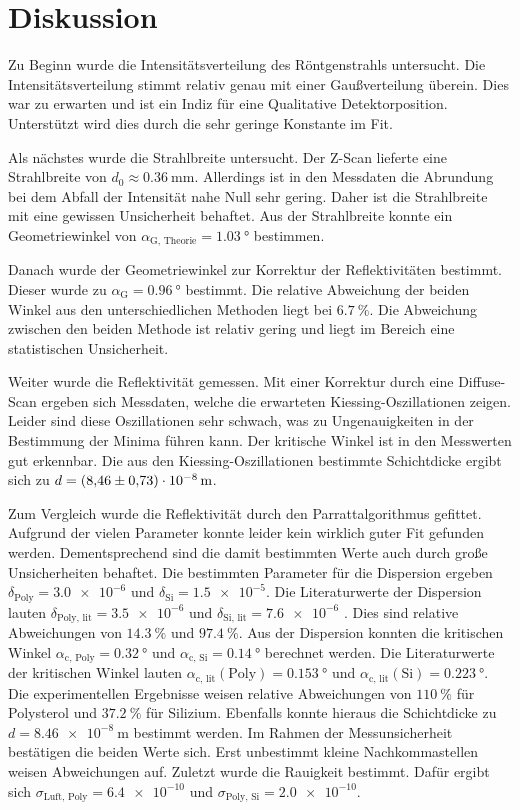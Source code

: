 \chapter{Diskussion}
\label{cha:Diskussion}
Zu Beginn wurde die Intensitätsverteilung des Röntgenstrahls untersucht. Die Intensitätsverteilung stimmt relativ genau mit einer Gaußverteilung überein. Dies war zu erwarten und 
ist ein Indiz für eine Qualitative Detektorposition. Unterstützt wird dies durch die sehr geringe Konstante im Fit. 

Als nächstes wurde die Strahlbreite untersucht. Der Z-Scan lieferte eine Strahlbreite von $d_0 \approx \qty{0.36}{\milli\metre}$. Allerdings ist in den Messdaten die Abrundung bei 
dem Abfall der Intensität nahe Null sehr gering. Daher ist die Strahlbreite mit eine gewissen Unsicherheit behaftet. Aus der Strahlbreite konnte ein Geometriewinkel von 
$\alpha_\text{G, Theorie} = \qty{1.03}{\degree}$ bestimmen.

Danach wurde der Geometriewinkel zur Korrektur der Reflektivitäten bestimmt. Dieser wurde zu $\alpha_\text{G} = \qty{0.96}{\degree}$ bestimmt. Die relative Abweichung der beiden Winkel 
aus den unterschiedlichen Methoden liegt bei $\qty{6.7}{\percent}$. Die Abweichung zwischen den beiden Methode ist relativ gering und liegt im Bereich eine statistischen Unsicherheit.

Weiter wurde die Reflektivität gemessen. Mit einer Korrektur durch eine Diffuse-Scan ergeben sich Messdaten, welche die erwarteten Kiessing-Oszillationen zeigen. Leider sind diese 
Oszillationen sehr schwach, was zu Ungenauigkeiten in der Bestimmung der Minima führen kann. Der kritische Winkel ist in den Messwerten gut erkennbar. Die aus den 
Kiessing-Oszillationen bestimmte Schichtdicke ergibt sich zu $d = \qty{8.46 +- 0.73e-8}{\metre}$.

Zum Vergleich wurde die Reflektivität durch den Parrattalgorithmus gefittet. Aufgrund der vielen Parameter konnte leider kein wirklich guter Fit gefunden werden. Dementsprechend 
sind die damit bestimmten Werte auch durch große Unsicherheiten behaftet. Die bestimmten Parameter für die Dispersion ergeben $\delta_\text{Poly} = \num{3.0e-6}$ und 
$\delta_\text{Si} = \num{1.5e-5}$. Die Literaturwerte der Dispersion lauten $\delta_\text{Poly, lit} = \num{3.5e-6}$ und $\delta_\text{Si, lit} = \num{7.6e-6}$ \cite{V44}.
Dies sind relative Abweichungen von $\qty{14.3}{\percent}$ und $\qty{97.4}{\percent}$. Aus der Dispersion konnten die kritischen Winkel 
$\alpha_\text{c, Poly} = \qty{0.32}{\degree}$ und $\alpha_\text{c, Si} = \qty{0.14}{\degree}$ berechnet werden. Die Literaturwerte der kritischen Winkel lauten 
$\alpha_\text{c, lit}(\text{Poly}) =\qty{0.153}{\degree}$ und $\alpha_\text{c, lit}(\text{Si}) =\qty{0.223}{\degree}$. Die experimentellen Ergebnisse weisen relative 
Abweichungen von $\qty{110}{\percent}$ für Polysterol und $\qty{37.2}{\percent}$ für Silizium. Ebenfalls konnte hieraus die Schichtdicke zu $d = \qty{8.46e-8}{\metre}$
bestimmt werden. Im Rahmen der Messunsicherheit bestätigen die beiden Werte sich. Erst unbestimmt kleine Nachkommastellen weisen Abweichungen auf.
Zuletzt wurde die Rauigkeit bestimmt. Dafür ergibt sich $\sigma_\text{Luft, Poly} = \num{6.4e-10}$ und $\sigma_\text{Poly, Si} = \num{2.0e-10}$.


